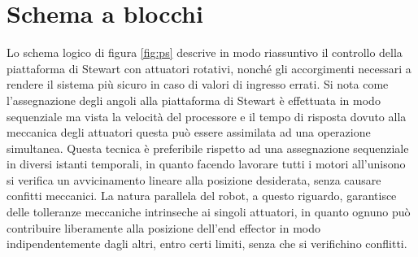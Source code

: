 \documentclass[12pt,twoside,openright]{report}
\begin{document}
\section{Schema a blocchi}\label{schemablocchi}
Lo schema logico di figura \ref{fig:ps} descrive in modo riassuntivo il controllo della piattaforma di Stewart con attuatori rotativi, nonché gli accorgimenti necessari a rendere il sistema più sicuro in caso di valori di ingresso errati.
Si nota come l'assegnazione degli angoli alla piattaforma di Stewart è effettuata in modo sequenziale ma vista la velocità del processore e il tempo di risposta dovuto alla meccanica degli attuatori questa può essere assimilata ad una operazione simultanea.
Questa tecnica è preferibile rispetto ad una assegnazione sequenziale in diversi istanti temporali, in quanto facendo lavorare tutti i motori all'unisono si verifica un avvicinamento lineare alla posizione desiderata, senza causare confitti meccanici. La natura parallela del robot, a questo riguardo, garantisce delle tolleranze meccaniche intrinseche ai singoli attuatori, in quanto ognuno può contribuire liberamente alla posizione dell'end effector in modo indipendentemente dagli altri, entro certi limiti, senza che si verifichino conflitti.
\end{document}
